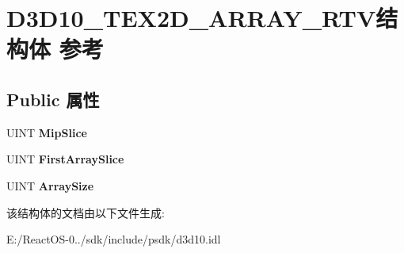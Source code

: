 \hypertarget{struct_d3_d10___t_e_x2_d___a_r_r_a_y___r_t_v}{}\section{D3\+D10\+\_\+\+T\+E\+X2\+D\+\_\+\+A\+R\+R\+A\+Y\+\_\+\+R\+T\+V结构体 参考}
\label{struct_d3_d10___t_e_x2_d___a_r_r_a_y___r_t_v}
\subsection*{Public 属性}
\begin{DoxyCompactItemize}
\item 
\mbox{\label{struct_d3_d10___t_e_x2_d___a_r_r_a_y___r_t_v_a1b5c7dbc90da0ea9919fa77d52691dba}} 
U\+I\+NT {\bfseries Mip\+Slice}
\item 
\mbox{\label{struct_d3_d10___t_e_x2_d___a_r_r_a_y___r_t_v_a18a7d74b2872b69b2fb03e33f87c15ee}} 
U\+I\+NT {\bfseries First\+Array\+Slice}
\item 
\mbox{\label{struct_d3_d10___t_e_x2_d___a_r_r_a_y___r_t_v_a02ddf0e7372b81262935c0139c856ee4}} 
U\+I\+NT {\bfseries Array\+Size}
\end{DoxyCompactItemize}


该结构体的文档由以下文件生成\+:\begin{DoxyCompactItemize}
\item 
E\+:/\+React\+O\+S-\/0../sdk/include/psdk/d3d10.\+idl\end{DoxyCompactItemize}
